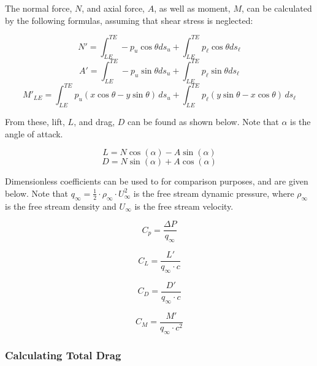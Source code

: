 \documentclass[11pt, letterpaper]{article}
\begin{document}
The normal force, $N$, and axial force, $A$, as well as moment, $M$, can be calculated by the following formulas, assuming that shear stress is neglected:

\begin{equation}
    N' = \int_{LE}^{TE} -p_u\cos\theta ds_u + \int_{LE}^{TE} p_\ell\cos\theta ds_\ell
    \label{eq:normal_force}
\end{equation}
\begin{equation}
    A' = \int_{LE}^{TE} -p_u\sin\theta ds_u + \int_{LE}^{TE} p_\ell\sin\theta ds_\ell
    \label{eq:axial_force}
\end{equation}
\begin{equation}
M'_{LE} = \int_{LE}^{TE} p_u(x\cos\theta - y\sin\theta) \, ds_u + \int_{LE}^{TE} p_\ell(y\sin\theta - x\cos\theta) \, ds_\ell
\end{equation}

From these, lift, $L$, and drag, $D$ can be found as shown below. Note that $\alpha$ is the angle of attack.

\begin{equation}
L = N \cos(\alpha) - A \sin(\alpha)
\end{equation}
\begin{equation}
D = N \sin(\alpha) + A \cos(\alpha)
\end{equation}

Dimensionless coefficients can be used to for comparison purposes, and are given below. Note that $q_\infty = \frac{1}{2} \cdot \rho_\infty \cdot U_\infty^2$ is the free stream dynamic pressure, where $\rho_\infty$ is the free stream density and $U_\infty$ is the free stream velocity.

\begin{equation}
C_p = \frac{\Delta P}{q_\infty}
\end{equation}

\begin{equation}
C_L = \frac{L'}{q_\infty \cdot c}
\end{equation}

\begin{equation}
C_D = \frac{D'}{q_\infty \cdot c}
\end{equation}

\begin{equation}
C_M = \frac{M'}{q_\infty \cdot c^2}
\end{equation}

\subsubsection{Calculating Total Drag}
\end{document}
